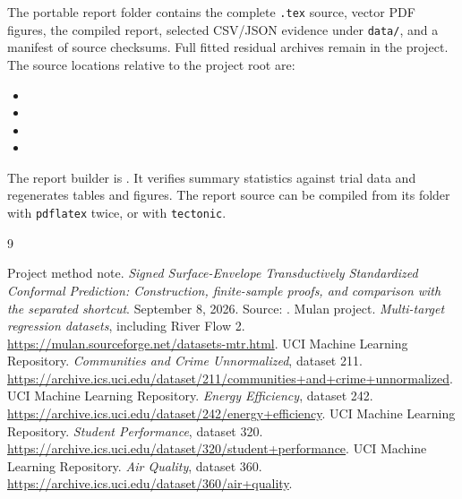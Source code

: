 \documentclass[11pt,letterpaper]{article}
\begin{document}
The portable report folder contains the complete \texttt{.tex} source,
vector PDF figures, the compiled report, selected CSV/JSON evidence under
\texttt{data/}, and a manifest of source checksums. Full fitted residual archives
remain in the project. The source locations relative to the project root are:
\begin{itemize}
\item {}
\item {}
\item {}
\item {}
\end{itemize}
The report builder is .
It verifies summary statistics against trial data and regenerates tables and
figures. The report source can be compiled from its folder with
\texttt{pdflatex} twice, or with \texttt{tectonic}.

\clearpage
\begin{thebibliography}{9}\small\raggedright
\setlength{\itemsep}{2pt}\setlength{\parskip}{0pt}
 Project method note.
\emph{Signed Surface-Envelope Transductively Standardized Conformal Prediction:
Construction, finite-sample proofs, and comparison with the separated shortcut}.
September 8, 2026. Source: .
 Mulan project. \emph{Multi-target regression datasets},
including River Flow 2.
\url{https://mulan.sourceforge.net/datasets-mtr.html}.
 UCI Machine Learning Repository.
\emph{Communities and Crime Unnormalized}, dataset 211.
\url{https://archive.ics.uci.edu/dataset/211/communities+and+crime+unnormalized}.
 UCI Machine Learning Repository.
\emph{Energy Efficiency}, dataset 242.
\url{https://archive.ics.uci.edu/dataset/242/energy+efficiency}.
 UCI Machine Learning Repository.
\emph{Student Performance}, dataset 320.
\url{https://archive.ics.uci.edu/dataset/320/student+performance}.
 UCI Machine Learning Repository.
\emph{Air Quality}, dataset 360.
\url{https://archive.ics.uci.edu/dataset/360/air+quality}.
\end{thebibliography}
\end{document}
